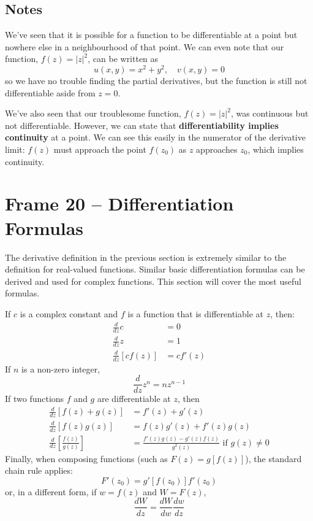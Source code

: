 \documentclass{article}
\renewcommand{\emph}{\textbf}
\begin{document}
\subsection{Notes}
We've seen that it is possible for a function to be differentiable at a point but nowhere else in a neighbourhood of that point. We can even note that our function, $f(z) = |z|^2$, can be written as
\[
	u(x, y) = x^2 + y^2,	\quad	v(x, y) = 0
\]
so we have no trouble finding the partial derivatives, but the function is still not differentiable aside from $z = 0$.

We've also seen that our troublesome function, $f(z) = |z|^2$, was continuous but not differentiable. However, we can state that \emph{differentiability implies continuity} at a point. We can see this easily in the numerator of the derivative limit: $f(z)$ must approach the point $f(z_0)$ as $z$ approaches $z_0$, which implies continuity.


\clearpage
\section{Frame 20 -- Differentiation Formulas}
The derivative definition in the previous section is extremely similar to the definition for real-valued functions. Similar basic differentiation formulas can be derived and used for complex functions. This section will cover the most useful formulas.

If $c$ is a complex constant and $f$ is a function that is differentiable at $z$, then:
\begin{align*}
	\frac{d}{dz} c &= 0 \\
	\frac{d}{dz} z &= 1 \\
	\frac{d}{dz} [cf(z)] &= cf'(z)
\end{align*}
If $n$ is a non-zero integer,
\[
	\frac{d}{dz} z^n = nz^{n-1}
\]
If two functions $f$ and $g$ are differentiable at $z$, then
\begin{align*}
	\frac{d}{dz} [f(z) + g(z)] &= f'(z) + g'(z) \\
	\frac{d}{dz} [f(z)g(z)] &= f(z)g'(z) + f'(z)g(z) \\
	\frac{d}{dz} \left[\frac{f(z)}{g(z)}\right] &= \frac{f'(z)g(z) - g'(z)f(z)}{g^2(z)} \text{ if $g(z) \neq 0$}
\end{align*}
Finally, when composing functions (such as $F(z) = g[f(z)]$), the standard chain rule applies:
\[
	F'(z_0) = g'[f(z_0)] f'(z_0)
\]
or, in a different form, if $w = f(z)$ and $W = F(z)$,
\[
	\frac{dW}{dz} = \frac{dW}{dw} \frac{dw}{dz}
\]
\end{document}
